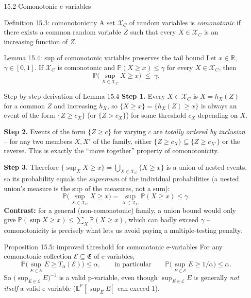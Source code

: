 \documentclass[aspectratio=169,10pt]{beamer}
\newcommand{\PP}{\mathbb{P}}
\newcommand{\EE}{\mathbb{E}}
\newcommand{\RR}{\mathbb{R}}
\newcommand{\calE}{\mathcal{E}}
\newcommand{\calX}{\mathcal{X}}
\newcommand{\frakE}{\mathfrak{E}}
\begin{document}
\begin{frame}[allowframebreaks]{15.2 Comonotonic e-variables}
  \begin{block}{Definition 15.3: comonotonicity}
    A set $\calX_C$ of random variables is \emph{comonotonic} if there exists a common random variable $Z$ such that every $X\in\calX_C$ is an increasing function of $Z$.
  \end{block}

  \begin{block}{Lemma 15.4: sup of comonotonic variables preserves the tail bound}
    Let $x\in\RR$, $\gamma\in[0,1]$. If $\calX_C$ is comonotonic and $\PP(X\ge x)\le\gamma$ for every $X\in\calX_C$, then
    \[
      \PP\Big(\sup_{X\in\calX_C}X \ge x\Big) \;\le\; \gamma.
    \]
  \end{block}

  \begin{block}{Step-by-step derivation of Lemma 15.4}
    \textbf{Step 1.} Every $X\in\calX_C$ is $X=h_X(Z)$ for a common $Z$ and increasing $h_X$, so $\{X\ge x\}=\{h_X(Z)\ge x\}$ is always an event of the form $\{Z\ge c_X\}$ (or $\{Z>c_X\}$) for some threshold $c_X$ depending on $X$.

    \textbf{Step 2.} Events of the form $\{Z\ge c\}$ for varying $c$ are \emph{totally ordered by inclusion} -- for any two members $X,X'$ of the family, either $\{Z\ge c_X\}\subseteq\{Z\ge c_{X'}\}$ or the reverse. This is exactly the ``move together'' property of comonotonicity.

    \textbf{Step 3.} Therefore $\{\sup_X X\ge x\} = \bigcup_{X\in\calX_C}\{X\ge x\}$ is a union of nested events, so its probability equals the \emph{supremum} of the individual probabilities (a nested union's measure is the sup of the measures, not a sum):
    \[
      \PP\Big(\sup_{X\in\calX_C}X\ge x\Big) = \sup_{X\in\calX_C}\PP(X\ge x) \le \gamma.
    \]
    \textbf{Contrast:} for a general (non-comonotonic) family, a union bound would only give $\PP(\sup X\ge x)\le\sum_X\PP(X\ge x)$, which can badly exceed $\gamma$ -- comonotonicity is precisely what lets us avoid paying a multiple-testing penalty.
  \end{block}

  \framebreak

  \begin{block}{Proposition 15.5: improved threshold for comonotonic e-variables}
    For any comonotonic collection $\calE\subseteq\frakE$ of e-variables,
    \[
      \PP\Big(\sup_{E\in\calE} E \ge T_\alpha(\calE)\Big) \le \alpha,
      \qquad\text{in particular}\qquad
      \PP\Big(\sup_{E\in\calE} E \ge 1/\alpha\Big) \le \alpha.
    \]
    So $\big(\sup_{E\in\calE}E\big)^{-1}$ is a valid p-variable, even though $\sup_{E\in\calE}E$ is generally \emph{not itself} a valid e-variable ($\EE^\PP[\sup_E E]$ can exceed $1$).
  \end{block}


\end{frame}
\end{document}

